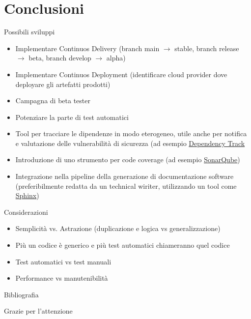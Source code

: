 \documentclass[10pt]{beamer}
\begin{document}
\section{Conclusioni}

\begin{frame}{Possibili sviluppi}

	\begin{itemize}

		\item
		Implementare Continuos Delivery (branch main $\rightarrow$ stable, branch release $\rightarrow$ beta, branch develop $\rightarrow$ alpha)

		\item		
		Implementare Continuos Deployment (identificare cloud provider dove deployare gli artefatti prodotti)

		\item
		Campagna di beta tester

		\item
		Potenziare la parte di test automatici

		\item
		Tool per tracciare le dipendenze in modo eterogeneo, utile anche per notifica e valutazione delle vulnerabilità di sicurezza (ad esempio \href{https://dependencytrack.org/}{Dependency Track}

		\item
		Introduzione di uno strumento per code coverage (ad esempio \href{https://www.sonarqube.org/}{SonarQube})

		\item
		Integrazione nella pipeline della generazione di documentazione software (preferibilmente redatta da un technical wiriter, utilizzando un tool come \href{https://www.sphinx-doc.org/}{Sphinx})

	\end{itemize}

\end{frame}

\begin{frame}{Considerazioni}
	\begin{itemize}
		
		\item
		Semplicità vs. Astrazione (duplicazione e logica vs generalizzazione)

		\item		
		Più un codice è generico e più test automatici chiameranno quel codice

		\item
		Test automatici vs test manuali

		\item
		Performance vs manutenibilità

	\end{itemize}
\end{frame}

\begin{frame}[allowframebreaks]{Bibliografia}

  
  

\end{frame}

\begin{frame}[standout]
Grazie per l'attenzione
\end{frame}
\end{document}
